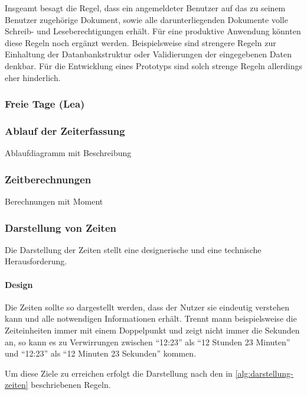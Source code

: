 


Insgeamt besagt die Regel,
dass ein angemeldeter Benutzer auf das zu seinem Benutzer zugehörige Dokument,
sowie alle darunterliegenden Dokumente volle Schreib- und Leseberechtigungen erhält.
Für eine produktive Anwendung könnten diese Regeln noch ergänzt werden.
Beispielsweise sind strengere Regeln zur Einhaltung der Datanbankstruktur oder Validierungen der eingegebenen Daten denkbar.
Für die Entwicklung eines Prototyps sind solch strenge Regeln allerdings eher hinderlich.

\subsubsection{Freie Tage (Lea)}

\subsubsection{Ablauf der Zeiterfassung}
Ablaufdiagramm mit Beschreibung

\subsubsection{Zeitberechnungen}
Berechnungen mit Moment

\subsubsection{Darstellung von Zeiten}
Die Darstellung der Zeiten stellt eine designerische und eine technische Herausforderung.

\paragraph{Design}
Die Zeiten sollte so dargestellt werden,
dass der Nutzer sie eindeutig verstehen kann und alle notwendigen Informationen erhält.
Trennt mann beispielsweise die Zeiteinheiten immer mit einem Doppelpunkt und zeigt nicht immer die Sekunden an,
so kann es zu Verwirrungen zwischen \enquote{12:23} als \enquote{12 Stunden 23 Minuten}
und \enquote{12:23} als \enquote{12 Minuten 23 Sekunden} kommen.

Um diese Ziele zu erreichen erfolgt die Darstellung nach den in \autoref{alg:darstellung-zeiten} beschriebenen Regeln.

